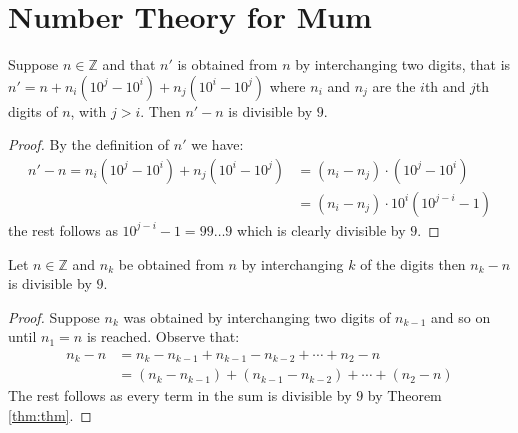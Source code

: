 \chapter{Number Theory for Mum}
\begin{theorem}\label{thm:thm}
  Suppose $n \in \mathbb{Z}$ and that $n'$ is obtained from $n$ by interchanging two digits, that is $n' = n + n_i (10^j - 10^{i}) + n_j(10^i - 10^{j})$ where $n_i$ and $n_j$ are the $i$th and $j$th digits of $n$, with $j > i$. Then $n' - n$ is divisible by $9$.
\end{theorem}
\begin{proof}
  By the definition of $n'$ we have:
  \begin{align*}
    n' - n = n_i (10^j - 10^{i}) + n_j(10^i - 10^{j})  &= (n_i - n_j) \cdot (10^j - 10^i) \\
                                                            &= (n_i - n_j) \cdot 10^i (10^{j - i} - 1)
  \end{align*}
  the rest follows as $10^{j - i} - 1 = 99 \ldots 9$ which is clearly divisible by $9$.
\end{proof}

\begin{corollary}
  Let $n \in \mathbb{Z}$ and $n_k$ be obtained from $n$ by interchanging $k$ of the digits then $n_{k} - n$ is divisible by $9$.
\end{corollary}
\begin{proof}
  Suppose $n_k$ was obtained by interchanging two digits of $n_{k - 1}$ and so on until $n_1 = n$ is reached.
  Observe that:
  \begin{align*}
    n_k - n &= n_k - n_{k-1} + n_{k-1} - n_{k - 2} + \cdots + n_2 - n \\
    &= (n_k - n_{k-1}) + (n_{k-1} - n_{k - 2}) + \cdots + (n_2 - n)
  \end{align*}
  The rest follows as every term in the sum is divisible by $9$ by Theorem \ref{thm:thm}.
\end{proof}
